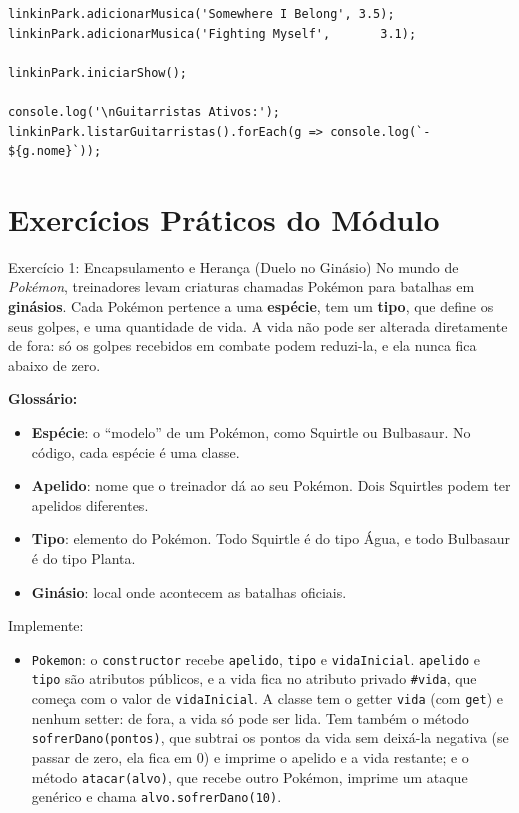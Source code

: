 \begin{lstlisting}[style=javascript, caption={Exemplo de Aplicação de POO em JavaScript}]
linkinPark.adicionarMusica('Somewhere I Belong', 3.5);
linkinPark.adicionarMusica('Fighting Myself',       3.1);

linkinPark.iniciarShow();

console.log('\nGuitarristas Ativos:');
linkinPark.listarGuitarristas().forEach(g => console.log(`- ${g.nome}`));
\end{lstlisting}

\section{Exercícios Práticos do Módulo}

\begin{exercicio}{Exercício 1: Encapsulamento e Herança (Duelo no Ginásio)}
No mundo de \textit{Pokémon}, treinadores levam criaturas chamadas Pokémon para batalhas em
\textbf{ginásios}. Cada Pokémon pertence a uma \textbf{espécie}, tem um \textbf{tipo}, que
define os seus golpes, e uma quantidade de vida. A vida não pode ser alterada diretamente de
fora: só os golpes recebidos em combate podem reduzi-la, e ela nunca fica abaixo de zero.

\textbf{Glossário:}
\begin{itemize}
    \item \textbf{Espécie}: o ``modelo'' de um Pokémon, como Squirtle ou Bulbasaur. No código,
    cada espécie é uma classe.
    \item \textbf{Apelido}: nome que o treinador dá ao seu Pokémon. Dois Squirtles podem ter
    apelidos diferentes.
    \item \textbf{Tipo}: elemento do Pokémon. Todo Squirtle é do tipo Água, e todo Bulbasaur é
    do tipo Planta.
    \item \textbf{Ginásio}: local onde acontecem as batalhas oficiais.
\end{itemize}

Implemente:

\begin{itemize}
    \item \texttt{Pokemon}: o \texttt{constructor} recebe \texttt{apelido}, \texttt{tipo} e
    \texttt{vidaInicial}. \texttt{apelido} e \texttt{tipo} são atributos públicos, e a vida fica
    no atributo privado \texttt{\#vida}, que começa com o valor de \texttt{vidaInicial}. A
    classe tem o getter \texttt{vida} (com \texttt{get}) e nenhum setter: de fora, a vida só pode
    ser lida. Tem também o método \texttt{sofrerDano(pontos)}, que subtrai os pontos da vida sem
    deixá-la negativa (se passar de zero, ela fica em 0) e imprime o apelido e a vida restante; e
    o método \texttt{atacar(alvo)}, que recebe outro Pokémon, imprime um ataque genérico e chama
    \texttt{alvo.sofrerDano(10)}.


\end{itemize}
\end{exercicio}
